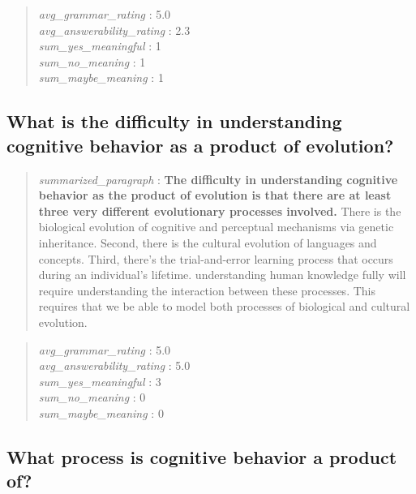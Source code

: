 \begin{quote}
\emph{avg\_grammar\_rating} : 5.0\\
\emph{avg\_answerability\_rating} : 2.3\\
\emph{sum\_yes\_meaningful} : 1\\
\emph{sum\_no\_meaning} : 1\\
\emph{sum\_maybe\_meaning} : 1
\end{quote}

\hypertarget{what-is-the-difficulty-in-understanding-cognitive-behavior-as-a-product-of-evolution}{%
\subsection{What is the difficulty in understanding cognitive behavior
as a product of
evolution?}\label{what-is-the-difficulty-in-understanding-cognitive-behavior-as-a-product-of-evolution}}

\begin{quote}
\emph{summarized\_paragraph} : \textbf{The difficulty in understanding
cognitive behavior as the product of evolution is that there are at
least three very different evolutionary processes involved.} There is
the biological evolution of cognitive and perceptual mechanisms via
genetic inheritance. Second, there is the cultural evolution of
languages and concepts. Third, there's the trial-and-error learning
process that occurs during an individual's lifetime. understanding human
knowledge fully will require understanding the interaction between these
processes. This requires that we be able to model both processes of
biological and cultural evolution.
\end{quote}

\begin{quote}
\emph{avg\_grammar\_rating} : 5.0\\
\emph{avg\_answerability\_rating} : 5.0\\
\emph{sum\_yes\_meaningful} : 3\\
\emph{sum\_no\_meaning} : 0\\
\emph{sum\_maybe\_meaning} : 0
\end{quote}

\hypertarget{what-process-is-cognitive-behavior-a-product-of}{%
\subsection{What process is cognitive behavior a product
of?}\label{what-process-is-cognitive-behavior-a-product-of}}

